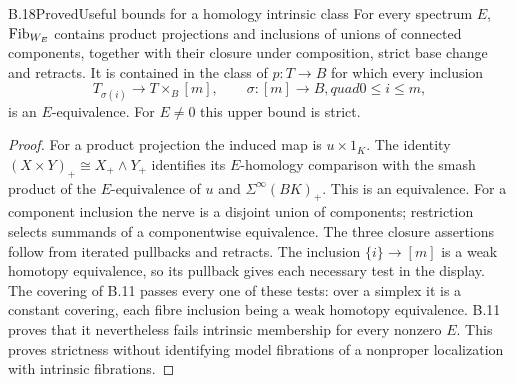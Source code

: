 \begin{claim}{B.18}{Proved}{Useful bounds for a homology intrinsic class}
For every spectrum $E$, $\mathrm{Fib}_{W_E}$ contains product projections and
inclusions of unions of connected components, together with their closure
under composition, strict base change and retracts. It is contained in the
class of $p:T\to B$ for which every inclusion
\[
 T_{\sigma(i)}\longrightarrow T\times_B[m],
 \qquad \sigma:[m]\to B,quad 0\leq i\leq m,
\]
is an $E$-equivalence. For $E\ne0$ this upper bound is strict.
\end{claim}
\begin{proof}
For a product projection the induced map is $u\times1_K$.
The identity $(X\times Y)_+\cong X_+\wedge Y_+$ identifies its
$E$-homology comparison with the smash product of the $E$-equivalence
of $u$ and $\Sigma^\infty(BK)_+$. This is an equivalence.
For a component inclusion the nerve is a disjoint union of components;
restriction selects summands of a componentwise equivalence.
The three closure assertions follow from iterated pullbacks and retracts.
The inclusion $\{i\}\to[m]$ is a weak homotopy equivalence, so its
pullback gives each necessary test in the display.
The covering of B.11 passes every one of these tests: over a simplex it
is a constant covering, each fibre inclusion being a weak homotopy
equivalence. B.11 proves that it nevertheless fails intrinsic membership
for every nonzero $E$. This proves strictness without identifying model
fibrations of a nonproper localization with intrinsic fibrations.
\end{proof}

